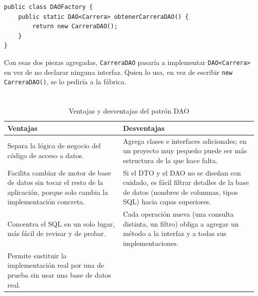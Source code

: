 \documentclass[10pt,a4paper]{article}
\begin{document}
\begin{lstlisting}[caption={DAO Factory ilustrativa}]
public class DAOFactory {
    public static DAO<Carrera> obtenerCarreraDAO() {
        return new CarreraDAO();
    }
}
\end{lstlisting}

Con esas dos piezas agregadas, \texttt{CarreraDAO} pasaría a implementar \texttt{DAO<Carrera>} en vez de no declarar ninguna interfaz. Quien lo usa, en vez de escribir \texttt{new CarreraDAO()}, se lo pediría a la fábrica.

\section{\color{colorIPN}{Ventajas y desventajas}}

\begin{table}[H]
	\centering
	\begin{tabular}{p{7.5cm} | p{7.5cm}}\hline \hline
		\textbf{Ventajas} & \textbf{Desventajas} \\ \hline \hline
		Separa la lógica de negocio del código de acceso a datos. & Agrega clases e interfaces adicionales; en un proyecto muy pequeño puede ser más estructura de la que hace falta. \\ \hline
		Facilita cambiar de motor de base de datos sin tocar el resto de la aplicación, porque solo cambia la implementación concreta. & Si el DTO y el DAO no se diseñan con cuidado, es fácil filtrar detalles de la base de datos (nombres de columnas, tipos SQL) hacia capas superiores. \\ \hline
		Concentra el SQL en un solo lugar, más fácil de revisar y de probar. & Cada operación nueva (una consulta distinta, un filtro) obliga a agregar un método a la interfaz y a todas sus implementaciones. \\ \hline
		Permite sustituir la implementación real por una de prueba sin usar una base de datos real. & \\ \hline \hline
	\end{tabular}
	\caption{Ventajas y desventajas del patrón DAO}
	\label{tabla:ventajas-dao}
\end{table}

\section{\color{colorIPN}{Conclusión}}
\end{document}
